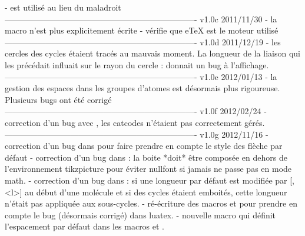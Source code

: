     - \box\z@ est utilis\'e au lieu du maladroit \unhbox\z@
----------------------------------------------------------------------
v1.0c      2011/11/30
    - la macro \+ n'est plus explicitement \'ecrite
    - v\'erifie que eTeX est le moteur utilis\'e
----------------------------------------------------------------------
v1.0d      2011/12/19
    - les cercles des cycles \'etaient trac\'es au mauvais moment. La
      longueur de la liaison qui les pr\'ec\'edait influait sur le
      rayon du cercle :  donnait un bug
      \`a l'affichage.
----------------------------------------------------------------------
v1.0e      2012/01/13
    - la gestion des espaces dans les groupes d'atomes est
      d\'esormais plus rigoureuse. Plusieurs bugs ont \'et\'e
      corrig\'e
----------------------------------------------------------------------
v1.0f      2012/02/24
    - correction d'un bug avec , les catcodes n'\'etaient
      pas correctement g\'er\'es.
----------------------------------------------------------------------
v1.0g      2012/11/16
    - correction d'un bug dans \CF@direct@arrow pour faire prendre en
      compte le style des fl\`eche par d\'efaut
    - correction d'un bug dans \CF@lewis@iii : la boite *doit* \^etre
      compos\'ee en dehors de l'environnement tikzpicture pour
      \'eviter nullfont si jamais \printatom ne passe pas en mode
      math.
    - correction d'un bug dans \CF@chemfig@iv : si une longueur par
      d\'efaut est modifi\'ee par [,<l>] au d\'ebut d'une mol\'ecule
      et si des cycles \'etaient emboit\'es, cette longueur n'\'etait
      pas appliqu\'ee aux sous-cycles.
    - r\'e-\'ecriture des macros \chemabove et \chembemow pour
      prendre en compte le bug (d\'esormais corrig\'e) dans luatex.
    - nouvelle macro \setstacksep qui d\'efinit l'espacement par
      d\'efaut dans les macros \chemabove et \chembelow.
